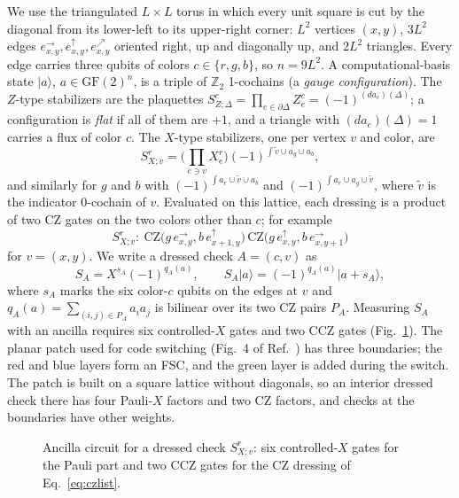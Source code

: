 \documentclass[a4paper]{article}
\newcommand{\rd}{r}
\newcommand{\gr}{g}
\newcommand{\bl}{b}
\newcommand{\GF}{\mathrm{GF}(2)}
\providecommand{\ket}[1]{\ensuremath{|#1\rangle}}
\newcommand{\eh}[1]{e^{\rightarrow}_{#1}}
\newcommand{\ev}[1]{e^{\uparrow}_{#1}}
\newcommand{\ed}[1]{e^{\nearrow}_{#1}}
\begin{document}
We use the triangulated $L\times L$ torus in which every unit square is cut by the diagonal from its lower-left to its upper-right corner: $L^2$ vertices $(x,y)$, $3L^2$ edges $\eh{x,y},\ev{x,y},\ed{x,y}$ oriented right, up and diagonally up, and $2L^2$ triangles. Every edge carries three qubits of colors $c\in\{\rd,\gr,\bl\}$, so $n=9L^2$. A computational-basis state $\ket{a}$, $a\in\GF^n$, is a triple of $\mathbb{Z}_2$ 1-cochains (a \emph{gauge configuration}). The $Z$-type stabilizers are the plaquettes $S^c_{Z;\Delta}=\prod_{e\in\partial\Delta}Z^c_e=(-1)^{(da_c)(\Delta)}$; a configuration is \emph{flat} if all of them are $+1$, and a triangle with $(da_c)(\Delta)=1$ carries a flux of color $c$. The $X$-type stabilizers, one per vertex $v$ and color, are~\cite{kobayashi2025clifford}
\begin{equation}
  S^{\rd}_{X;v}=\Big(\prod_{e\ni v}X^{\rd}_e\Big)(-1)^{\int\tilde v\cup a_\gr\cup a_\bl},
  \label{eq:xstab}
\end{equation}
and similarly for $\gr$ and $\bl$ with $(-1)^{\int a_\rd\cup\tilde v\cup a_\bl}$ and $(-1)^{\int a_\rd\cup a_\gr\cup\tilde v}$, where $\tilde v$ is the indicator 0-cochain of $v$. Evaluated on this lattice, each dressing is a product of two CZ gates on the two colors other than $c$; for example
\begin{equation}
  S^\rd_{X;v}:\ \mathrm{CZ}\big(\gr\,\eh{x,y},\bl\,\ev{x+1,y}\big)\,\mathrm{CZ}\big(\gr\,\ev{x,y},\bl\,\eh{x,y+1}\big)
  \label{eq:czlist}
\end{equation}
for $v=(x,y)$. We write a dressed check $A=(c,v)$ as
\begin{equation}
  S_A=X^{s_A}(-1)^{q_A(a)},\qquad S_A\ket{a}=(-1)^{q_A(a)}\ket{a+s_A},
  \label{eq:generic}
\end{equation}
where $s_A$ marks the six color-$c$ qubits on the edges at $v$ and $q_A(a)=\sum_{(i,j)\in P_A}a_ia_j$ is bilinear over its two CZ pairs $P_A$. Measuring $S_A$ with an ancilla requires six controlled-$X$ gates and two CCZ gates (Fig.~\ref{fig:xstab_circuit}). The planar patch used for code switching (Fig.~4 of Ref.~\cite{kobayashi2025clifford}) has three boundaries; the red and blue layers form an FSC, and the green layer is added during the switch. The patch is built on a square lattice without diagonals, so an interior dressed check there has four Pauli-$X$ factors and two CZ factors, and checks at the boundaries have other weights.

\begin{figure}[t]
    \centering
    
    \caption{Ancilla circuit for a dressed check $S^{\rd}_{X;v}$: six controlled-$X$ gates for the Pauli part and two CCZ gates for the CZ dressing of Eq.~\eqref{eq:czlist}.}
    \label{fig:xstab_circuit}
\end{figure}
\end{document}
